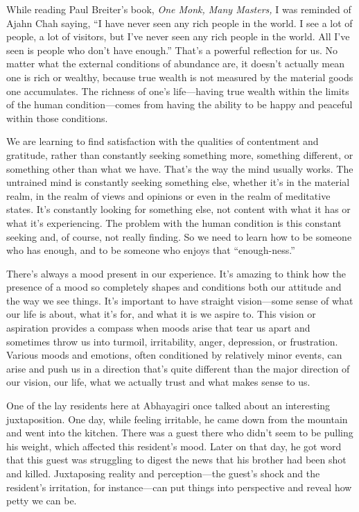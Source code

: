 While reading Paul Breiter's book, \emph{One Monk, Many Masters,} I was 
reminded of Ajahn Chah saying, ``I have never seen any rich people in 
the world. I see a lot of people, a lot of visitors, but I've never 
seen any rich people in the world. All I've seen is people who don't 
have enough.'' That's a powerful reflection for us. No matter what the 
external conditions of abundance are, it doesn't actually mean one is 
rich or wealthy, because true wealth is not measured by the material 
goods one accumulates. The richness of one's life---having true wealth 
within the limits of the human condition---comes from having the 
ability to be happy and peaceful within those conditions.

We are learning to find satisfaction with the qualities of contentment 
and gratitude, rather than constantly seeking something more, something 
different, or something other than what we have. That's the way the 
mind usually works. The untrained mind is constantly seeking something 
else, whether it's in the material realm, in the realm of views and 
opinions or even in the realm of meditative states. It's constantly 
looking for something else, not content with what it has or what it's 
experiencing. The problem with the human condition is this constant 
seeking and, of course, not really finding. So we need to learn how to 
be someone who has enough, and to be someone who enjoys that 
``enough-ness.''


There's always a mood present in our experience. It's amazing to think 
how the presence of a mood so completely shapes and conditions both our 
attitude and the way we see things. It's important to have straight 
vision---some sense of what our life is about, what it's for, and what 
it is we aspire to. This vision or aspiration provides a compass when 
moods arise that tear us apart and sometimes throw us into turmoil, 
irritability, anger, depression, or frustration. Various moods and 
emotions, often conditioned by relatively minor events, can arise and 
push us in a direction that's quite different than the major direction 
of our vision, our life, what we actually trust and what makes sense to 
us.

One of the lay residents here at Abhayagiri once talked about an 
interesting juxtaposition. One day, while feeling irritable, he came 
down from the mountain and went into the kitchen. There was a guest 
there who didn't seem to be pulling his weight, which affected this 
resident's mood. Later on that day, he got word that this guest was 
struggling to digest the news that his brother had been shot and 
killed. Juxtaposing reality and perception---the guest's shock and the 
resident's irritation, for instance---can put things into perspective 
and reveal how petty we can be.

